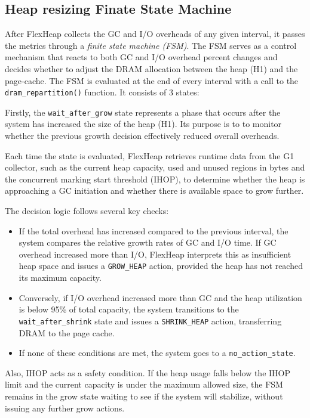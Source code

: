\subsection{Heap resizing Finate State Machine}

After FlexHeap collects the GC and I/O overheads of any given interval, it passes the metrics through 
a \textit{finite state machine (FSM)}. The FSM serves as a control mechanism 
that reacts to both GC and I/O overhead percent changes and decides whether to adjust the DRAM allocation 
between the heap (H1) and the page-cache. The FSM is evaluated at the end of every interval with a
call to the \texttt{dram\_repartition()} function. It consists of 3 states:

Firstly, the \texttt{wait\_after\_grow} state represents a phase that occurs after 
the system has increased the size of the heap (H1). Its purpose is to 
to monitor whether the previous growth decision effectively 
reduced overall overheads. 

Each time the state is evaluated, FlexHeap retrieves runtime data from the G1 collector, 
such as the current heap capacity, used and unused regions in bytes and the concurrent marking 
start threshold (IHOP), to determine whether the heap is approaching 
a GC initiation and whether there is available space to grow further.

The decision logic follows several key checks:
\begin{itemize}
  \item If the total overhead has increased compared to the previous interval, the system
    compares the relative growth rates of GC and I/O time. If GC overhead increased more than I/O, 
    FlexHeap interprets this as insufficient heap space and issues a \texttt{GROW\_HEAP} action, 
    provided the heap has not reached its maximum capacity. 
  \item Conversely, if I/O overhead increased more than GC and the heap utilization is below 95\% of
    total capacity, the system transitions to the \texttt{wait\_after\_shrink} state and issues a 
    \texttt{SHRINK\_HEAP} action, transferring DRAM to the page cache.
  \item If none of these conditions are met, the system goes to a \texttt{no\_action\_state}.
\end{itemize}

Also, IHOP acts as a safety condition. If the heap usage falls below the 
IHOP limit and the current capacity is under the maximum allowed size, the FSM remains in the 
grow state waiting to see if the system will stabilize, without issuing any further grow actions.

